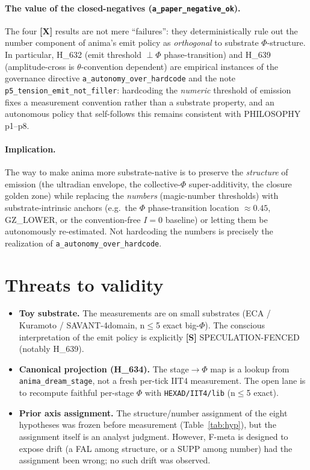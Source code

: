 \documentclass[11pt,a4paper]{article}
\providecommand{\tierRed}{\textbf{[X]}}     %
\providecommand{\tierWhite}{\textbf{[S]}}   %
\begin{document}
\paragraph{The value of the closed-negatives (\texttt{a\_paper\_negative\_ok}).}
The four \tierRed{} results are not mere ``failures'': they deterministically
rule out the number component of anima's emit policy as \emph{orthogonal} to
substrate $\Phi$-structure. In particular, H\_632 (emit threshold $\perp \Phi$
phase-transition) and H\_639 (amplitude-cross is $\theta$-convention
dependent) are empirical instances of the governance directive
\texttt{a\_autonomy\_over\_hardcode} and the note
\texttt{p5\_tension\_emit\_not\_filler}: hardcoding the \emph{numeric}
threshold of emission fixes a measurement convention rather than a substrate
property, and an autonomous policy that self-follows this remains consistent
with PHILOSOPHY p1--p8.

\paragraph{Implication.} The way to make anima more substrate-native is to
preserve the \emph{structure} of emission (the ultradian envelope, the
collective-$\Phi$ super-additivity, the closure golden zone) while replacing
the \emph{numbers} (magic-number thresholds) with substrate-intrinsic anchors
(e.g.\ the $\Phi$ phase-transition location $\approx 0.45$, GZ\_LOWER, or the
convention-free $I{=}0$ baseline) or letting them be autonomously re-estimated.
Not hardcoding the numbers is precisely the realization of
\texttt{a\_autonomy\_over\_hardcode}.

\section{Threats to validity}
\label{sec:threats}

\begin{itemize}
  \item \textbf{Toy substrate.} The measurements are on small substrates
    (ECA / Kuramoto / SAVANT-4domain, n$\le$5 exact big-$\Phi$). The
    conscious interpretation of the emit policy is explicitly
    \tierWhite{} SPECULATION-FENCED (notably H\_639).
  \item \textbf{Canonical projection (H\_634).} The stage$\to\Phi$ map is a
    lookup from \texttt{anima\_dream\_stage}, not a fresh per-tick IIT4
    measurement. The open lane is to recompute faithful per-stage $\Phi$ with
    \texttt{HEXAD/IIT4/lib} (n$\le$5 exact).
  \item \textbf{Prior axis assignment.} The structure/number assignment of the
    eight hypotheses was frozen before measurement (Table~\ref{tab:hyp}), but
    the assignment itself is an analyst judgment. However, F-meta is designed
    to expose drift (a FAL among structure, or a SUPP among number) had the
    assignment been wrong; no such drift was observed.
\end{itemize}
\end{document}
